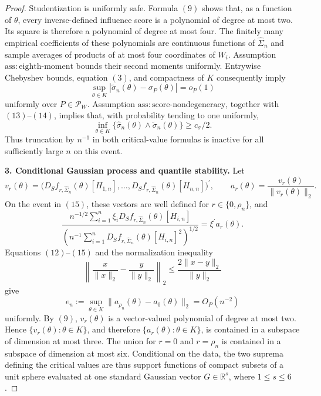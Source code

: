 \documentclass{article}
\begin{document}
\begin{proof}
Studentization is uniformly safe. Formula \((9)\) shows that, as a function of \(\theta\), every inverse-defined influence score is a polynomial of degree at most two. Its square is therefore a polynomial of degree at most four. The finitely many empirical coefficients of these polynomials are continuous functions of \(\widehat\Sigma_n\) and sample averages of products of at most four coordinates of \(W_i\). Assumption \(\mathrm{ass:eighth\mbox{-}moment}\) bounds their second moments uniformly. Entrywise Chebyshev bounds, equation \((3)\), and compactness of \(K\) consequently imply
\[
 \sup_{\theta\in K}|\widetilde\sigma_n(\theta)-\sigma_P(\theta)|=o_P(1) \tag{14}
\]
uniformly over \(P\in\mathcal P_W\). Assumption \(\mathrm{ass:score\mbox{-}nondegeneracy}\), together with \((13)\)--\((14)\), implies that, with probability tending to one uniformly,
\[
 \inf_{\theta\in K}\{\widehat\sigma_n(\theta)\wedge\widetilde\sigma_n(\theta)\}
 \geq c_{\sigma}/2. \tag{15}
\]
Thus truncation by \(n^{-1}\) in both critical-value formulas is inactive for all sufficiently large \(n\) on this event.

\textbf{3. Conditional Gaussian process and quantile stability.}
Let
\[
 v_r(\theta)=\bigl(D_Sf_{r,\widehat\Sigma_n}(\theta)[H_{1,n}],\ldots,
 D_Sf_{r,\widehat\Sigma_n}(\theta)[H_{n,n}]\bigr)^{\prime},
 \qquad
 a_r(\theta)=\frac{v_r(\theta)}{\|v_r(\theta)\|_2}.
\]
On the event in \((15)\), these vectors are well defined for \(r\in\{0,\rho_n\}\), and
\[
 \frac{n^{-1/2}\sum_{i=1}^n\xi_iD_Sf_{r,\widehat\Sigma_n}(\theta)[H_{i,n}]}
 {(n^{-1}\sum_{i=1}^nD_Sf_{r,\widehat\Sigma_n}(\theta)[H_{i,n}]^2)^{1/2}}
 =\xi^{\prime}a_r(\theta). \tag{16}
\]
Equations \((12)\)--\((15)\) and the normalization inequality
\[
 \left\|\frac{x}{\|x\|_2}-\frac{y}{\|y\|_2}\right\|_2
 \leq \frac{2\|x-y\|_2}{\|y\|_2}
\]
give
\[
 e_n:=\sup_{\theta\in K}\|a_{\rho_n}(\theta)-a_0(\theta)\|_2=O_P(n^{-2}) \tag{17}
\]
uniformly. By \((9)\), \(v_r(\theta)\) is a vector-valued polynomial of degree at most two. Hence \(\{v_r(\theta):\theta\in K\}\), and therefore \(\{a_r(\theta):\theta\in K\}\), is contained in a subspace of dimension at most three. The union for \(r=0\) and \(r=\rho_n\) is contained in a subspace of dimension at most six. Conditional on the data, the two suprema defining the critical values are thus support functions of compact subsets of a unit sphere evaluated at one standard Gaussian vector \(G\in\mathbb R^s\), where \(1\leq s\leq6\).


\end{proof}
\end{document}
